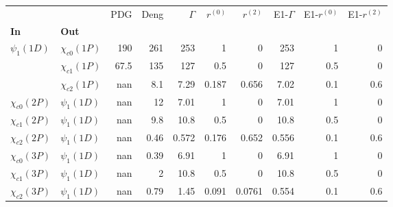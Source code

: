 \begin{tabular}{l|l|r|r|r|r|r|r|r|r}
\toprule
                &                &  PDG &  Deng &  $\Gamma$ &  $r^{(0)}$ &  $r^{(2)}$ &  E1-$\Gamma$ &  E1-$r^{(0)}$ &  E1-$r^{(2)}$ \\
\textbf{In} & \textbf{Out} &      &       &           &            &            &              &               &               \\
\midrule
\textbf{$\psi_{1}(1D)$} & \textbf{$\chi_{c0}(1P)$} &  190 &   261 &       253 &          1 &          0 &          253 &             1 &             0 \\
                & \textbf{$\chi_{c1}(1P)$} & 67.5 &   135 &       127 &        0.5 &          0 &          127 &           0.5 &             0 \\
                & \textbf{$\chi_{c2}(1P)$} &  nan &   8.1 &      7.29 &      0.187 &      0.656 &         7.02 &           0.1 &           0.6 \\
\textbf{$\chi_{c0}(2P)$} & \textbf{$\psi_{1}(1D)$} &  nan &    12 &      7.01 &          1 &          0 &         7.01 &             1 &             0 \\
\textbf{$\chi_{c1}(2P)$} & \textbf{$\psi_{1}(1D)$} &  nan &   9.8 &      10.8 &        0.5 &          0 &         10.8 &           0.5 &             0 \\
\textbf{$\chi_{c2}(2P)$} & \textbf{$\psi_{1}(1D)$} &  nan &  0.46 &     0.572 &      0.176 &      0.652 &        0.556 &           0.1 &           0.6 \\
\textbf{$\chi_{c0}(3P)$} & \textbf{$\psi_{1}(1D)$} &  nan &  0.39 &      6.91 &          1 &          0 &         6.91 &             1 &             0 \\
\textbf{$\chi_{c1}(3P)$} & \textbf{$\psi_{1}(1D)$} &  nan &     2 &      10.8 &        0.5 &          0 &         10.8 &           0.5 &             0 \\
\textbf{$\chi_{c2}(3P)$} & \textbf{$\psi_{1}(1D)$} &  nan &  0.79 &      1.45 &      0.091 &     0.0761 &        0.554 &           0.1 &           0.6 \\
\bottomrule
\end{tabular}
